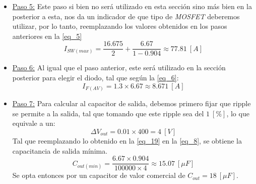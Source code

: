\documentclass[12pt,a4paper]{article}
\begin{document}
\begin{itemize}
    Dadas las ventajas constructivas físicas del \textit{MOSFET}, se tiene que este permite trabajar con frecuencias de conmutación mucho más altas que las de los IGBTs~\cite[pág. 20]{b9}~\cite{b10}, sin embargo para este tipo de aplicaciones, se utilizan otros tipos de \textit{MOSFETs} los cuales se discutirán en secciones posteriores.
        
    Dada la topología de 6 ramas ($N = 6$), el sistema se beneficia de una frecuencia efectiva de $N \times f_{s}$. Esto permite seleccionar una $f_{s}$ conservadora por rama de $100 \ [kHz]$, garantizando una frecuencia efectiva de filtrado de $600 \ [kHz]$. Por lo tanto, si: $f_{s} = 100 \ [kHz]$, se tiene que reemplazando este valor en la \autoref{eq_4}, se tiene que:
    \begin{equation}
        L = \frac{48 \times (400 - 48)}{16.675 \times 100000 \times 400} \approx 25.33 \ [\mu Hy]
        \label{eq_16}
    \end{equation}
    
    
    \item \underline{Paso 5:} Este paso si bien no será utilizado en esta sección sino más bien en la posterior a esta, nos da un indicador de que tipo de \textit{MOSFET} deberemos utilizar, por lo tanto, reemplazando los valores obtenidos en los pasos anteriores en la \autoref{eq_5}
    \begin{equation}
        I_{SW(max)} = \frac{16.675}{2} + \frac{6.67}{1 - 0.904} \approx 77.81 \ [A]
        \label{eq_17}
    \end{equation}


    \item \underline{Paso 6:} Al igual que el paso anterior, este será utilizado en la sección posterior para elegir el diodo, tal que según la \autoref{eq_6}:
    \begin{equation}
        I_{F(AV)} = 1.3 \times 6.67 \approx 8.671 \ [A]
        \label{eq_18}
    \end{equation}


    \item \underline{Paso 7:} Para calcular al capacitor de salida, debemos primero fijar que ripple se permite a la salida, tal que tomando que este ripple sea del $1 \ [\%]$, lo que equivale a un:
    \begin{equation}
        \Delta V_{out} = 0.01 \times 400 = 4 \ [V]
        \label{eq_19}
    \end{equation}
    Tal que reemplazando lo obtenido en la \autoref{eq_19} en la \autoref{eq_8}, se obtiene la capacitancia de salida mínima.
    \begin{equation}
        C_{out(min)} = \frac{6.67 \times 0.904}{100000 \times 4} \approx 15.07 \ [\mu F]
        \label{eq_20}
    \end{equation}
    Se opta entonces por un capacitor de valor comercial de $C_{out} = 18 \ [\mu F]$.


\end{itemize}
\end{document}
